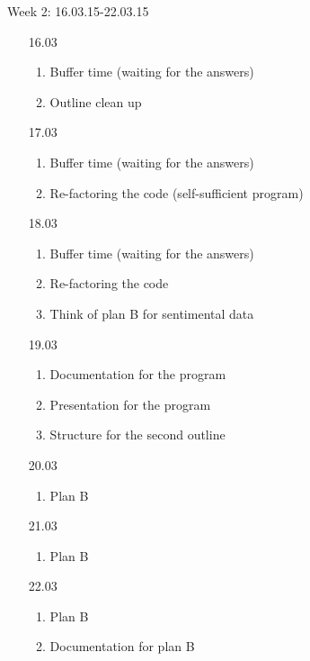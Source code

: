 \documentclass {article}
\begin{document}
Week 2: 16.03.15-22.03.15
\begin{enumerate}
	\item[16.03]
		\begin{enumerate}
			\item Buffer time (waiting for the answers)
			\item Outline clean up
		\end{enumerate}
	\item[17.03]
		\begin{enumerate}
			\item Buffer time (waiting for the answers)
			\item Re-factoring the code (self-sufficient program)
			
		\end{enumerate}
	\item[18.03]
		\begin{enumerate}
			\item Buffer time (waiting for the answers)
			\item Re-factoring the code
			\item Think of plan B for sentimental data
		\end{enumerate}
	\item[19.03]
		\begin{enumerate}
			\item Documentation for the program
			\item Presentation for the program 
			\item Structure for the second outline
		\end{enumerate}
	\item[20.03]
		\begin{enumerate}
			\item Plan B
		\end{enumerate}
	\item[21.03]
		\begin{enumerate}
			\item Plan B
		\end{enumerate}
	\item[22.03]
		\begin{enumerate}
			\item Plan B
			\item Documentation for plan B
		\end{enumerate}
\end{enumerate}
\end{document}
